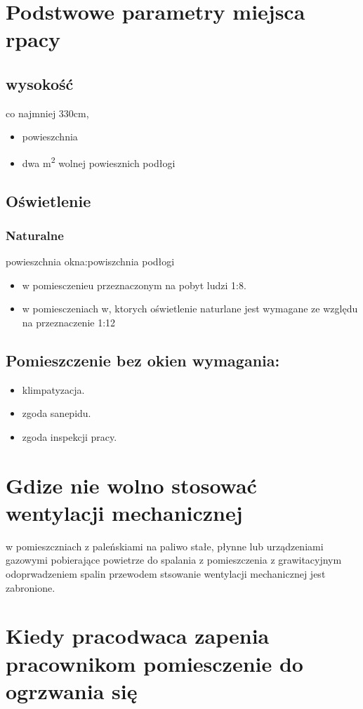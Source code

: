 \documentclass[11pt]{article}
\begin{document}
\section{Podstwowe parametry miejsca rpacy}
\label{sec:orgec0fe67}
\subsection{wysokość}
\label{sec:orgc6b8b3e}
co najmniej 330cm,
\begin{itemize}
\item powieszchnia
\item dwa m\textsuperscript{2} wolnej powiesznich podłogi
\end{itemize}
\subsection{Oświetlenie}
\label{sec:orgc53ad3e}
\subsubsection{Naturalne}
\label{sec:orgf0581c2}
powieszchnia okna:powiszchnia podłogi
\begin{itemize}
\item w pomiesczenieu przeznaczonym na pobyt ludzi 1:8.
\item w pomiesczeniach w, ktorych oświetlenie naturlane jest wymagane ze względu na przeznaczenie 1:12
\end{itemize}
\subsection{Pomieszczenie bez okien wymagania:}
\label{sec:orgc0ee457}
\begin{itemize}
\item klimpatyzacja.
\item zgoda sanepidu.
\item zgoda inspekcji pracy.
\end{itemize}
\section{Gdize nie wolno stosować wentylacji mechanicznej}
\label{sec:orge83e698}
w pomieszczniach z paleńskiami na paliwo stałe, płynne lub urządzeniami gazowymi pobierające powietrze do spalania z pomieszczenia z grawitacyjnym odoprwadzeniem spalin przewodem stsowanie wentylacji mechanicznej jest zabronione.
\section{Kiedy pracodwaca zapenia pracownikom pomiesczenie do ogrzwania się}
\label{sec:orge23aea0}
\end{document}
